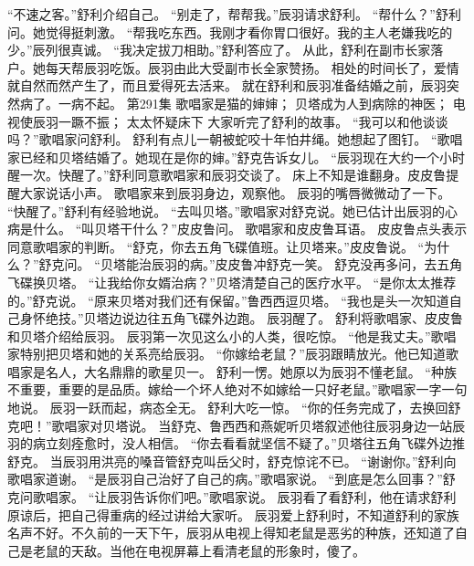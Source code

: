 \documentclass[a4paper,12pt,UTF8,twoside]{ctexbook}
\begin{document}
        “不速之客。”舒利介绍自己。  
        “别走了，帮帮我。”辰羽请求舒利。  
        “帮什么？”舒利问。她觉得挺刺激。        
        “帮我吃东西。我刚才看你胃口很好。我的主人老嫌我吃的少。”辰列很真诚。  
        “我决定拔刀相助。”舒利答应了。  
        从此，舒利在副市长家落户。她每天帮辰羽吃饭。辰羽由此大受副市长全家赞扬。  
        相处的时间长了，爱情就自然而然产生了，而且爱得死去活来。  
        就在舒利和辰羽准备结婚之前，辰羽突然病了。一病不起。          第291集  
        歌唱家是猫的婶婶；  
        贝塔成为人到病除的神医；  
        电视使辰羽一蹶不振；  
        太太怀疑床下    
        大家听完了舒利的故事。  
        “我可以和他谈谈吗？”歌唱家问舒利。  
        舒利有点儿一朝被蛇咬十年怕井绳。她想起了图钉。  
        “歌唱家已经和贝塔结婚了。她现在是你的婶。”舒克告诉女儿。  
        “辰羽现在大约一个小时醒一次。快醒了。”舒利同意歌唱家和辰羽交谈了。  
        床上不知是谁翻身。皮皮鲁提醒大家说话小声。  
        歌唱家来到辰羽身边，观察他。  
        辰羽的嘴唇微微动了一下。        
        “快醒了。”舒利有经验地说。  
        “去叫贝塔。”歌唱家对舒克说。她已估计出辰羽的心病是什么。  
        “叫贝塔干什么？”皮皮鲁问。  
        歌唱家和皮皮鲁耳语。  
        皮皮鲁点头表示同意歌唱家的判断。  
        “舒克，你去五角飞碟值班。让贝塔来。”皮皮鲁说。  
        “为什么？”舒克问。  
        “贝塔能治辰羽的病。”皮皮鲁冲舒克一笑。  
        舒克没再多问，去五角飞碟换贝塔。  
        “让我给你女婿治病？”贝塔清楚自己的医疗水平。  
        “是你太太推荐的。”舒克说。  
        “原来贝塔对我们还有保留。”鲁西西逗贝塔。  
        “我也是头一次知道自己身怀绝技。”贝塔边说边往五角飞碟外边跑。  
        辰羽醒了。  
        舒利将歌唱家、皮皮鲁和贝塔介绍给辰羽。  
        辰羽第一次见这么小的人类，很吃惊。  
        “他是我丈夫。”歌唱家特别把贝塔和她的关系亮给辰羽。  
        “你嫁给老鼠？”辰羽跟睛放光。他已知道歌唱家是名人，大名鼎鼎的歌星贝一。        
        舒利一愣。她原以为辰羽不懂老鼠。  
        “种族不重要，重要的是品质。嫁给一个坏人绝对不如嫁给一只好老鼠。”歌唱家一字一句地说。  
        辰羽一跃而起，病态全无。  
        舒利大吃一惊。  
        “你的任务完成了，去换回舒克吧！”歌唱家对贝塔说。  
        当舒克、鲁西西和燕妮听贝塔叙述他往辰羽身边一站辰羽的病立刻痊愈时，没人相信。  
        “你去看看就坚信不疑了。”贝塔往五角飞碟外边推舒克。  
        当辰羽用洪亮的嗓音管舒克叫岳父时，舒克惊诧不已。  
        “谢谢你。”舒利向歌唱家道谢。  
        “是辰羽自己治好了自己的病。”歌唱家说。  
        “到底是怎么回事？”舒克问歌唱家。  
        “让辰羽告诉你们吧。”歌唱家说。  
        辰羽看了看舒利，他在请求舒利原谅后，把自己得重病的经过讲给大家听。  
        辰羽爱上舒利时，不知道舒利的家族名声不好。不久前的一天下午，辰羽从电视上得知老鼠是恶劣的种族，还知道了自己是老鼠的天敌。当他在电视屏幕上看清老鼠的形象时，傻了。  
\end{document}
